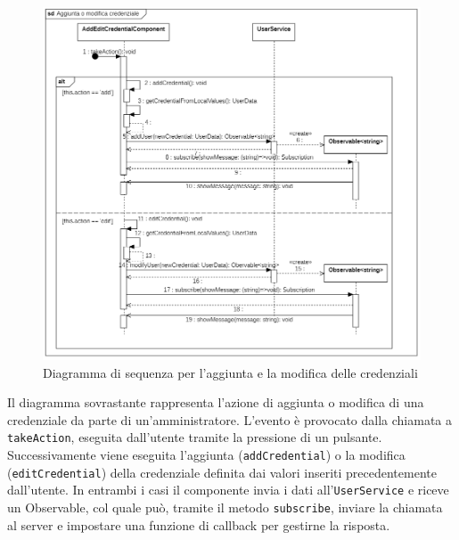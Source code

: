 \begin{figure}[H]
	\centering
	\includegraphics[width=18cm]{res/images/webapp-credenzialiAddEdit-diagrammaSequenza.png}
	\caption{Diagramma di sequenza per l'aggiunta e la modifica delle credenziali}
	\label{fig:DiagrammaSequenzaVisualizzazioneCredenziali}
\end{figure}
Il diagramma sovrastante rappresenta l'azione di aggiunta o modifica di una credenziale da parte di un'amministratore. L'evento è provocato dalla chiamata a \texttt{takeAction}, eseguita dall'utente tramite la pressione di un pulsante. Successivamente viene eseguita l'aggiunta (\texttt{addCredential}) o la modifica (\texttt{editCredential}) della credenziale definita dai valori inseriti precedentemente dall'utente. In entrambi i casi il componente invia i dati all'\texttt{UserService} e riceve un Observable, col quale può, tramite il metodo \texttt{subscribe}, inviare la chiamata al server e impostare una funzione di callback per gestirne la risposta.



